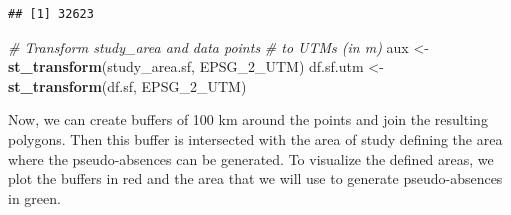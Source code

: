 \documentclass[
]{book}
\newenvironment{Shaded}{\begin{snugshade}}{\end{snugshade}}
\newcommand{\CommentTok}[1]{\textcolor[rgb]{0.56,0.35,0.01}{\textit{#1}}}
\newcommand{\ControlFlowTok}[1]{\textcolor[rgb]{0.13,0.29,0.53}{\textbf{#1}}}
\newcommand{\DecValTok}[1]{\textcolor[rgb]{0.00,0.00,0.81}{#1}}
\newcommand{\FunctionTok}[1]{\textcolor[rgb]{0.13,0.29,0.53}{\textbf{#1}}}
\newcommand{\NormalTok}[1]{#1}
\newcommand{\OtherTok}[1]{\textcolor[rgb]{0.56,0.35,0.01}{#1}}
\newcommand{\SpecialCharTok}[1]{\textcolor[rgb]{0.81,0.36,0.00}{\textbf{#1}}}
\begin{document}
\begin{Shaded}
\end{Shaded}

\begin{verbatim}
## [1] 32623
\end{verbatim}

\begin{Shaded}
\begin{Highlighting}[]
\CommentTok{\# Transform study\_area and data points}
\CommentTok{\# to UTMs (in m)}
\NormalTok{aux }\OtherTok{\textless{}{-}} \FunctionTok{st\_transform}\NormalTok{(study\_area.sf, EPSG\_2\_UTM)}
\NormalTok{df.sf.utm }\OtherTok{\textless{}{-}} \FunctionTok{st\_transform}\NormalTok{(df.sf, EPSG\_2\_UTM)}
\end{Highlighting}
\end{Shaded}

Now, we can create buffers of 100 km around the points and join the resulting polygons. Then this buffer is intersected with the area of study defining the area where the pseudo-absences can be generated. To visualize the defined areas, we plot the buffers in red and the area that we will use to generate pseudo-absences in green.
\end{document}
